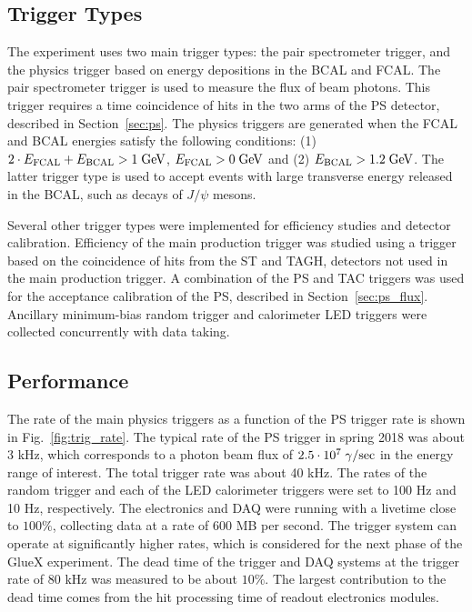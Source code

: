 \subsection{Trigger Types \label{sec:triggers}}

The \gx{} experiment uses two main trigger types: the pair spectrometer trigger, and the physics trigger based on energy depositions in the BCAL and FCAL. The 
pair spectrometer trigger is used to measure the flux of beam photons. This trigger requires a time coincidence of hits in the 
two arms of the PS detector, described in Section~\ref{sec:ps}. The physics triggers are generated when the FCAL and BCAL energies  satisfy the following conditions: (1) $2\cdot E_{\rm FCAL} + E_{\rm BCAL} > 1\;{\rm GeV}$,  $E_{\rm FCAL} > 0\; {\rm GeV}$ and (2) $E_{\rm BCAL} > 1.2\;{\rm GeV}$. The latter trigger type is used to accept events with large transverse energy released in the BCAL, such as decays of $J/\psi$ mesons. 

Several other trigger types were implemented for efficiency studies and detector calibration. 
Efficiency of the main production trigger was studied using a trigger based on the coincidence of hits from the ST and TAGH, detectors not used in the main production trigger. A combination of the PS and TAC triggers was used for the acceptance calibration of the PS, described in Section~\ref{sec:ps_flux}. Ancillary minimum-bias random trigger and calorimeter LED triggers were collected concurrently with data taking.

\subsection{Performance \label{sec:trigperformance}}
The rate of the main physics triggers as a function of the PS trigger rate is shown in Fig.~\ref{fig:trig_rate}.
The typical rate of the PS trigger in spring 2018 was about 3 kHz, which corresponds to a photon beam flux of $2.5\cdot 10^7\; \gamma/{\rm sec}$ in the \gx{} energy range of interest. The total trigger rate was about 40 kHz. The rates of the random trigger and each of the LED calorimeter triggers were set to 100 Hz and 10 Hz, respectively. The electronics and DAQ were running with a livetime close to 
$100 \%$, collecting data at a rate of 600 MB per second.
The trigger system can operate at significantly higher rates, which is considered for the next phase
of the GlueX experiment. The dead time of the trigger and DAQ systems at the trigger rate of 80 kHz
was measured to be about $10 \%$. The largest contribution to the dead time comes from the hit processing
time of readout electronics modules. 

